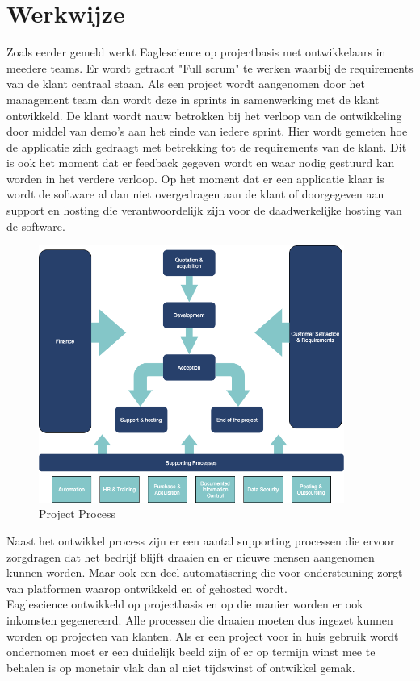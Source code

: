 \section{Werkwijze}
Zoals eerder gemeld werkt Eaglescience op projectbasis met ontwikkelaars in meedere teams. Er wordt getracht "Full scrum" te werken waarbij de requirements van de klant centraal staan. Als een project wordt aangenomen door het management team dan wordt deze in sprints in samenwerking met de klant ontwikkeld. De klant wordt nauw betrokken bij het verloop van de ontwikkeling door middel van demo's aan het einde van iedere sprint. Hier wordt gemeten hoe de applicatie zich gedraagt met betrekking tot de requirements van de klant. Dit is ook het moment dat er feedback gegeven wordt en waar nodig gestuurd kan worden in het verdere verloop. Op het moment dat er een applicatie klaar is wordt de software al dan niet overgedragen aan de klant of doorgegeven aan support en hosting die verantwoordelijk zijn voor de daadwerkelijke hosting van de software.
\begin{figure}[bth]
\myfloatalign
\includegraphics[width=10cm]{gfx/ProcessFlow}
\caption{Project Process}
\label{fig:Project Process}
\end{figure}

Naast het ontwikkel process zijn er een aantal supporting processen die ervoor zorgdragen dat het bedrijf blijft draaien en er nieuwe mensen aangenomen kunnen worden. Maar ook een deel automatisering die voor ondersteuning zorgt van platformen waarop ontwikkeld en of gehosted wordt.\\
Eaglescience ontwikkeld op projectbasis en op die manier worden er ook inkomsten gegenereerd. Alle processen die draaien moeten dus ingezet kunnen worden op projecten van klanten. Als er een project voor in huis gebruik wordt ondernomen moet er een duidelijk beeld zijn of er op termijn winst mee te behalen is op monetair vlak dan al niet tijdswinst of ontwikkel gemak.

